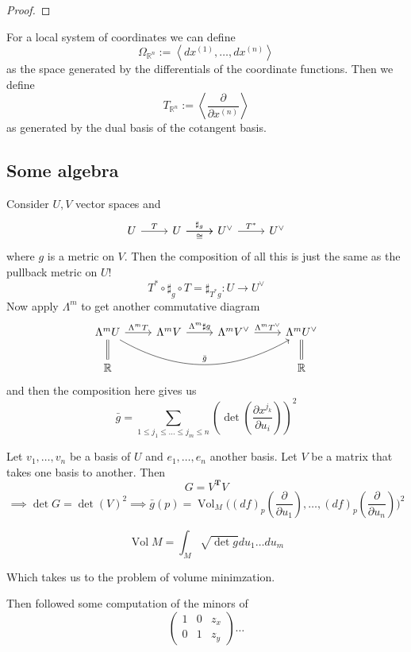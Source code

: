 \begin{proof}\leavevmode
\end{proof}

\begin{defn}\leavevmode
For a local system of coordinates we can define
\[\Omega_{\mathbb{R}^n}:=\left<dx^{(1)},\ldots,dx^{(n)}\right>\]
as the space generated by the differentials of the coordinate functions. Then we define
\[T_{\mathbb{R}^n}:=\left<\frac{\partial }{\partial x^{(n)}}\right>\]
as generated by the dual basis of the cotangent basis.
\end{defn}

\subsection{Some algebra}

Consider \(U,V\) vector spaces and
\[\begin{tikzcd}
	U \arrow[r,"T"]& U \arrow[ r,"\sharp_g"]\arrow[r,"\cong",swap]&  U^{\vee}\arrow[r,"T^*"]&  U^{\vee}
\end{tikzcd}\]
where \(g\) is a metric on \(V\). Then the composition of all this is just the same as the pullback metric on \(U\)! 
\[T^*  \circ \sharp_g \circ T=\sharp_{T^*g}:U \to U^{\vee}\]
Now apply \(\Lambda^{m}\) to get another commutative diagram
\[\begin{tikzcd}
	\Lambda^{m}U \arrow[ r,"\Lambda^{m}T"]\arrow[rrr,bend right,"\bar{g}"]\arrow[d,equals]&\Lambda^{m}V\arrow[r,"\Lambda^{m}\sharp g"]&\Lambda^{m}V^{\vee}\arrow[ r,"\Lambda^{m}T^{\vee}"]&  \Lambda^{m}U^{\vee}\arrow[d,equals]\\
	\mathbb{R}& & & \mathbb{R}
\end{tikzcd}\]
and then the composition here gives us
\[\bar{g}=\sum_{1\leq  j_1\leq \ldots \leq j_m \leq n}\left(\det\left(\frac{\partial x^{j_k}}{\partial u_i}\right) \right) ^2\]

Let \(v_1,\ldots,v_n\) be a basis of \(U\) and \(e_1,\ldots,e_n\) another basis. Let \(V\) be a matrix that takes one basis to another. Then
\[G=V^{\mathbf{T}}V\]
\[\implies \det G= \det(V)^2\implies \bar{g}(p)=\operatorname{Vol}_M\Big((df)_p\left(\frac{\partial }{\partial u_1}\right),\ldots,(df)_p\left(\frac{\partial }{\partial u_n}\right) \Big)^2 \]

\begin{defn}\leavevmode
 \[\operatorname{Vol}M=\int_M\sqrt{\det g}du_1\ldots du_m \]
\end{defn}

Which takes us to the problem of volume minimzation.

Then followed some computation of the minors of
\[\begin{pmatrix} 1&0&z_x\\0&1&z_y \end{pmatrix}\ldots \]


\clearpage

